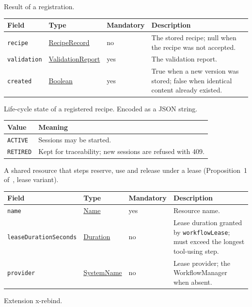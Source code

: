 \documentclass[a4paper]{arrowhead}
\newcommand{\mref}[1]{{\textcolor{ArrowheadPurple}{\hyperref[sec:model:#1]{#1}}}}
\newcommand{\pref}[1]{{\textcolor{ArrowheadGrey}{\hyperref[sec:model:primitives:#1]{#1}}}}
\begin{document}
Result of a registration.

{\small
\begin{longtable}{|p{3.7cm}|p{4.2cm}|p{1.6cm}|p{6.3cm}|}

\hline
\rowcolor{gray!33} Field & Type & Mandatory & Description \\ \hline
\endhead
\texttt{recipe} & \mref{RecipeRecord} & no & The stored recipe; null when the recipe was not accepted. \\ \hline
\texttt{validation} & \mref{ValidationReport} & yes & The validation report. \\ \hline
\texttt{created} & \pref{Boolean} & yes & True when a new version was stored; false when identical content already existed. \\ \hline
\end{longtable}
}

Life-cycle state of a registered recipe.
 Encoded as a JSON string.
{\small
\begin{longtable}{|p{3.9cm}|p{11.9cm}|}

\hline
\rowcolor{gray!33} Value & Meaning \\ \hline
\endhead
\texttt{ACTIVE} & Sessions may be started. \\ \hline
\texttt{RETIRED} & Kept for traceability; new sessions are refused with 409. \\ \hline
\end{longtable}
}

A shared resource that steps reserve, use and release under a lease (Proposition~1 of~\cite{varga2026}, lease variant).

{\small
\begin{longtable}{|p{3.7cm}|p{4.2cm}|p{1.6cm}|p{6.3cm}|}

\hline
\rowcolor{gray!33} Field & Type & Mandatory & Description \\ \hline
\endhead
\texttt{name} & \pref{Name} & yes & Resource name. \\ \hline
\texttt{leaseDurationSeconds} & \pref{Duration} & no & Lease duration granted by \texttt{workflowLease}; must exceed the longest tool-using step. \\ \hline
\texttt{provider} & \pref{SystemName} & no & Lease provider; the WorkflowManager when absent. \\ \hline
\end{longtable}
}

Extension x-rebind.
\end{document}

